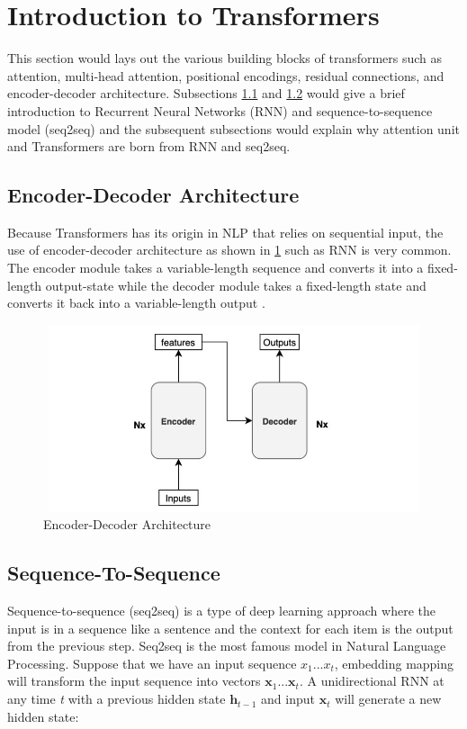 \section{Introduction to Transformers}
This section would  lays out the various building blocks of transformers such as attention, multi-head attention, positional encodings, residual connections, and encoder-decoder architecture. Subsections \ref{subsection: encoder-decoder} and \ref{subsection: sequence} would give a brief introduction to Recurrent Neural Networks (RNN) and sequence-to-sequence model (seq2seq) and the subsequent subsections would explain why attention unit and Transformers are born from RNN and seq2seq. 
\subsection{Encoder-Decoder Architecture} \label{subsection: encoder-decoder}

Because Transformers has its origin in NLP that relies on sequential input, the use of encoder-decoder architecture as shown in \ref{fig:encoder-decoder} such as RNN is very common. The encoder module takes a variable-length sequence and converts it into a fixed-length output-state while the decoder module takes a fixed-length state and converts it back into a variable-length output \cite{attention}.
\begin{figure}[ht]
\includegraphics[width=13.5cm, height=5.5cm]{images/encodeer-decoder.jpg}
\centering
\caption{Encoder-Decoder Architecture \protect\cite{attention}}
\label{fig:encoder-decoder}
\end{figure}



\subsection{Sequence-To-Sequence} \label{subsection: sequence}

Sequence-to-sequence (seq2seq) is a type of deep learning approach where the input is in a sequence like a sentence and the context for each item is the output from the previous step. Seq2seq is the most famous model in Natural Language Processing. Suppose that we have an input sequence $x_1...x_t$, embedding mapping will transform the input sequence into vectors $\mathbf{x}_1...\mathbf{x}_t$. A unidirectional RNN at any time \textit{t} with a previous hidden state $\mathbf{h}_{t-1}$ and input $\mathbf{x}_t$ will generate a new hidden state:

